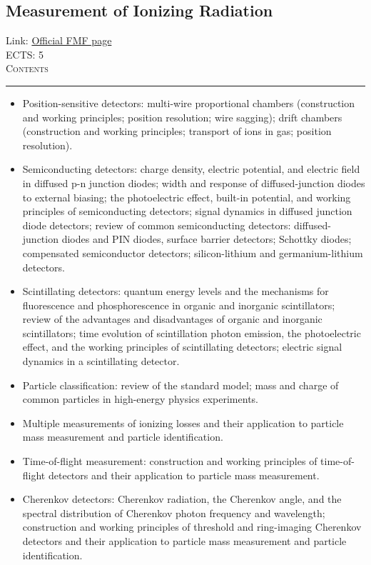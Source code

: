 \documentclass[11pt, a4paper]{article}
\newenvironment{course}[3]{
\subsection{#1}%
Link: \href{#2}{Official FMF page}\\%
ECTS: #3%
\vspace{1ex}
\\
{\large \textsc{Contents}}\\[-0.9ex]%
\rule{\textwidth}{0.5pt}
\vspace{-3ex}
}
{}
\newenvironment{chapter}[1]{
\begin{tcolorbox}[title=#1, breakable]
}
{\end{tcolorbox}}
\begin{document}
\begin{course}{Measurement of Ionizing Radiation}{https://www.fmf.uni-lj.si/en/study-physics/programmes/1fiz/2020/7000777/courses/1446/}{5}
\begin{chapter}{Particle detectors}
\begin{itemize}
            \item Position-sensitive detectors: multi-wire proportional chambers (construction and working principles; position resolution; wire sagging); drift chambers (construction and working principles; transport of ions in gas; position resolution).

            \item Semiconducting detectors: charge density, electric potential, and electric field in diffused p-n junction diodes; width and response of diffused-junction diodes to external biasing; the photoelectric effect, built-in potential, and working principles of semiconducting detectors; signal dynamics in diffused junction diode detectors; review of common semiconducting detectors: diffused-junction diodes and PIN diodes, surface barrier detectors; Schottky diodes; compensated semiconductor detectors; silicon-lithium and germanium-lithium detectors.

            \item Scintillating detectors: quantum energy levels and the mechanisms for fluorescence and phosphorescence in organic and inorganic scintillators; review of the advantages and disadvantages of organic and inorganic scintillators; time evolution of scintillation photon emission, the photoelectric effect, and the working principles of scintillating detectors; electric signal dynamics in a scintillating detector.

        \end{itemize}
    \end{chapter}

    \begin{chapter}{Particle identification}
        \begin{itemize}
        
            \item Particle classification: review of the standard model; mass and charge of common particles in high-energy physics experiments.

            \item Multiple measurements of ionizing losses and their application to particle mass measurement and particle identification.

            \item Time-of-flight measurement: construction and working principles of time-of-flight detectors and their application to particle mass measurement.

            \item Cherenkov detectors: Cherenkov radiation, the Cherenkov angle, and the spectral distribution of Cherenkov photon frequency and wavelength; construction and working principles of threshold and ring-imaging Cherenkov detectors and their application to particle mass measurement and particle identification.


\end{itemize}
\end{chapter}
\end{course}
\end{document}
